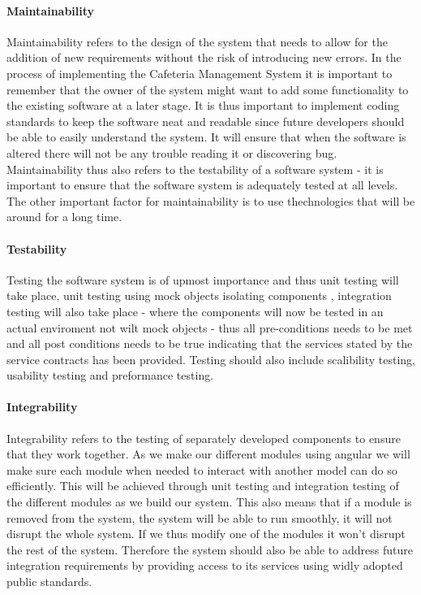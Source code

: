 \documentclass[12pt]{article}
\begin{document}
\paragraph{Maintainability\\}
Maintainability refers to the design of the system that needs to allow for the addition of new requirements without the risk of introducing new errors. In the process of implementing the Cafeteria Management System it is important to remember that the owner of the system might  want to add some functionality to the existing software at a later stage. It is thus important to implement coding standards to keep the software neat and readable since future developers should be able to easily understand the system. It will ensure that when the software is altered there will not be any trouble reading it or discovering bug. Maintainability thus also refers to the testability of a software system - it is important to ensure that the software system is adequately tested at all levels.\\
The other important factor for maintainability is to use thechnologies that will be around for a long time. 

\paragraph{Testability\\}
Testing the software system is of upmost importance and thus unit testing will take place, unit testing using mock objects isolating components , integration testing will also take place - where the components will now be tested in an actual enviroment not wilt mock objects - thus all pre-conditions needs to be met and all post conditions needs to be true indicating that the services stated by the service contracts has been provided. Testing should also include scalibility testing, usability testing and preformance testing. 

\paragraph{Integrability\\}
Integrability  refers to the testing of separately developed components to ensure that they work together. As we make our different  modules using angular we will make sure each module when needed to interact with another model can do so efficiently. This will be achieved through unit testing and integration testing of the different modules as we build our system. This also means that if a module is removed from the system, the system will be able to run smoothly, it will not disrupt the whole system. If we thus modify one of the modules it won't disrupt the rest of the system. 
Therefore the system should also be able to address future integration requirements by providing access to its services using widly adopted public standards.
\end{document}
